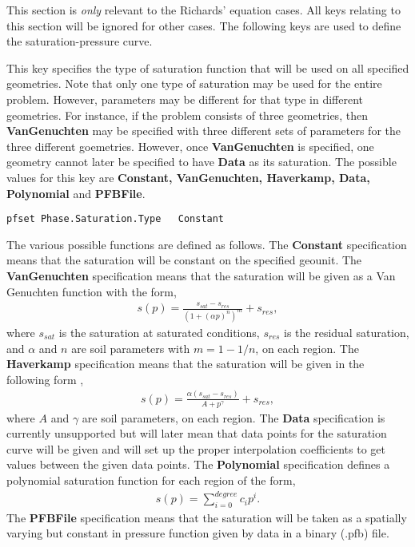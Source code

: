 This section is {\em only} relevant to the Richards' equation cases.  All keys
relating to this section will be ignored for other cases.
The following keys are used to define the saturation-pressure curve.

{
This key specifies the type of saturation function that will be used
on all specified geometries.  Note that only one type of saturation
may be used for the entire problem.  However, parameters may be different for
that type in different geometries.  For instance, if the problem consists of
three geometries, then {\bf VanGenuchten} may be specified with three different
sets of parameters for the three different goemetries.  However, once {\bf
VanGenuchten} is specified, one geometry cannot later be specified to have {\bf
Data} as its saturation.  The possible values for this key
are {\bf Constant, VanGenuchten, Haverkamp, Data, Polynomial} and
{\bf PFBFile}.
}
\begin{display}\begin{verbatim}
pfset Phase.Saturation.Type   Constant
\end{verbatim}\end{display}

The various possible functions are defined as follows.
The {\bf Constant} specification means that the saturation will be
constant on the specified geounit.  The {\bf VanGenuchten} specification means
that the saturation will be given as a Van Genuchten function
\cite{VanGenuchten80} with the form,
\begin{eqnarray}
s(p) = \frac{s_{sat} - s_{res}}{(1 + (\alpha p)^n)^m} + s_{res},
\end{eqnarray}
where $s_{sat}$ is the saturation at saturated conditions,
$s_{res}$ is the residual saturation, and
$\alpha$ and $n$ are soil parameters with $m = 1 - 1/n$, on each region.
The {\bf Haverkamp} specification means that the saturation will be
given in the following form \cite{Haverkamp-Vauclin81},
\begin{eqnarray}
s(p) = \frac{\alpha(s_{sat} - s_{res})}{A + p^{\gamma}} + s_{res},
\end{eqnarray}
where $A$ and $\gamma$ are soil parameters, on each region.
The {\bf Data} specification is currently unsupported but will later mean that
data points for the saturation curve will be given and \parflow{}
will set up the proper interpolation coefficients to get values between the
given data points.
The {\bf Polynomial} specification
defines a polynomial saturation function for each region of the form,
\begin{eqnarray}
s(p) = \sum_{i=0}^{degree} c_ip^i.
\end{eqnarray}
The {\bf PFBFile} specification means that the saturation will be taken as a
spatially varying but constant in pressure function given by data in a
\parflow{} binary (.pfb) file.

